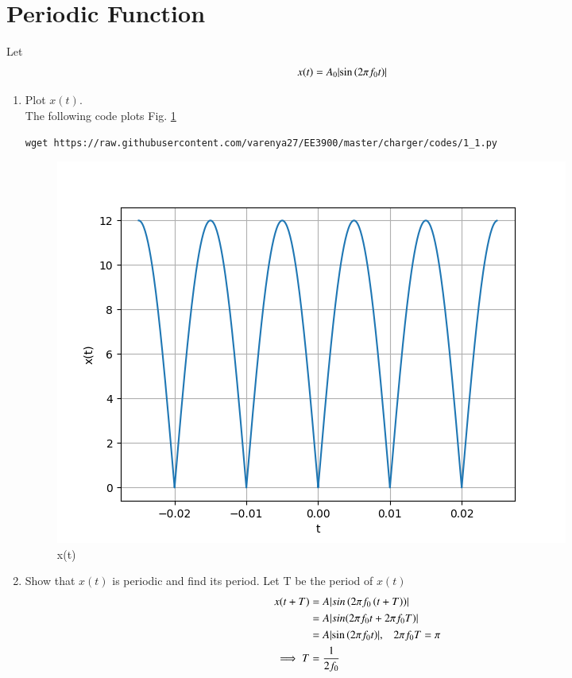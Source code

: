 \documentclass[journal,12pt,twocolumn]{IEEEtran}
\DeclarePairedDelimiter\abs{\lvert}{\rvert}%
\renewcommand\thesection{\arabic{section}}
\begin{document}
\section{Periodic Function}
Let 
\begin{align}
	x(t) &= A_0\abs{\sin\brak{2\pi f_0 t}}\label{eq:10-orig-diff-def}
\end{align}
\begin{enumerate}[label=\thesection.\arabic*
,ref=\thesection.\theenumi]
\item Plot $x(t)$.
\\\solution The following code plots Fig. \ref{fig:xt}
	\begin{lstlisting}
wget https://raw.githubusercontent.com/varenya27/EE3900/master/charger/codes/1_1.py
\end{lstlisting}
	\begin{figure}[h!]
	    \centering
	    \includegraphics[width=\columnwidth]{figures/1_1.png}
	    \caption{x(t) }
	    \label{fig:xt}
	\end{figure}

\item Show that $x(t)$ is periodic and find its period.
Let T be the period of $x(t)$
\begin{align}
    x(t+T) &= A\abs{sin\brak{2\pi f_0\brak{t+T}}}\\
    &= A\abs{sin(2\pi f_0t+2\pi f_0T)}\\
    &= A\abs{\sin\brak{2\pi f_0 t}} \text,\quad 2\pi f_0T=\pi\\
    \implies T&= \frac{1}{2f_0}
\end{align}
\end{enumerate}
\end{document}
